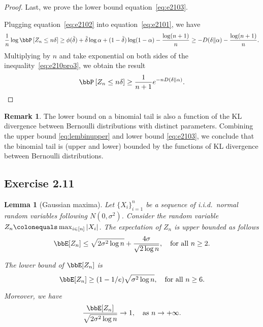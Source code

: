 \documentclass[11pt]{article}
\newcommand{\off}[1]{\left[#1\right]}
\theoremstyle{plain}
\newtheorem{lem}{Lemma}
\theoremstyle{definition}
\newtheorem{rmk}{Remark}
\begin{document}
\begin{proof}
	\vspace{0.2cm}
	Last, we prove the lower bound equation~\eqref{eq:e2103}.
	
	\vspace{0.2cm}
	Plugging equation~\eqref{eq:e2102} into equation~\eqref{eq:e2101}, we have
	\begin{equation}\label{eq:e210pro3}
		\frac{1}{n} \log \bbP \off{Z_n \leq n\delta} \geq \phi(\tilde \delta) + \tilde \delta \log \alpha + (1 - \tilde \delta ) \log (1-\alpha) - \frac{\log(n+1)}{n} \geq -D(\delta \Vert \alpha ) - \frac{\log(n+1)}{n}.
	\end{equation}
	Multiplying by $n$ and take exponential on both sides of the inequality~\eqref{eq:e210pro3}, we obtain the result
	\begin{equation}
		\bbP \off{Z_n \leq n\delta} \geq \frac{1}{n+1} e^{-nD(\delta \Vert \alpha)}.
	\end{equation}
\end{proof}

\begin{rmk}
	The lower bound on a binomial tail is also a function of the KL divergence between Bernoulli distributions with distinct parameters. Combining the upper bound \eqref{eq:lembinupper} and lower bound \eqref{eq:e2103}, we conclude that the binomial tail is (upper and lower) bounded by the functions of  KL divergence between Bernoulli distributions.
\end{rmk}


\subsection{Exercise 2.11}\label{Gausmax}
\begin{lem}[Gaussian maxima]
Let $\{X_i\}_{i=1}^n$ be a sequence of i.i.d.\ normal random variables following $N(0,\sigma^2)$. Consider the random variable $Z_n \colonequals \max_{i\in[n]} |X_i|$. The expectation of $Z_n$ is upper bounded as follows
\begin{equation}\label{eq:e2111}
	\bbE[Z_n] \leq \sqrt{2 \sigma^2 \log n} + \frac{4\sigma}{\sqrt{2 \log n}}, \quad \text{for all } n\geq 2.
\end{equation}

The lower bound of $\bbE[Z_n] $ is
\begin{equation}\label{eq:e2112}
	\bbE[Z_n] \geq (1- 1/e) \sqrt{\sigma^2 \log n} , \quad \text{for all }n \geq 6.
\end{equation}

Moreover, we have
\begin{equation}\label{eq:e2113}
	\frac{\bbE[Z_n]}{\sqrt{2 \sigma^2 \log n}} \rightarrow 1, \quad \text{as $n \rightarrow +\infty$}.
\end{equation}

\end{lem}
\end{document}
